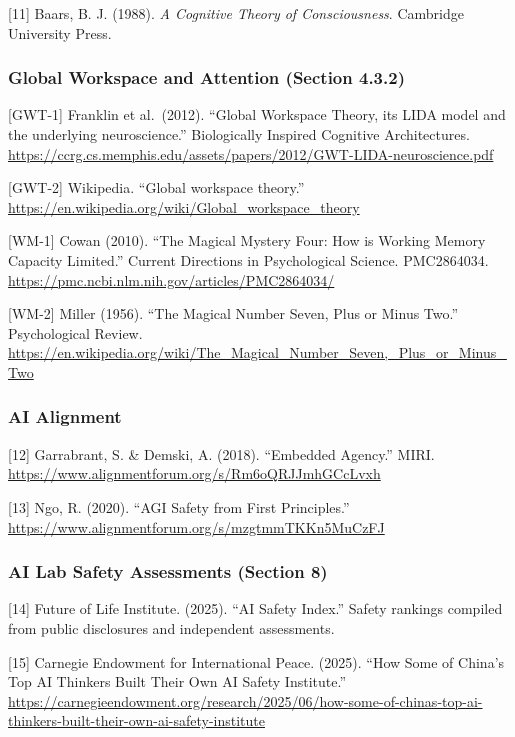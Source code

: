 \documentclass[
  11pt,
]{article}
\begin{document}
{[}11{]} Baars, B. J. (1988). \emph{A Cognitive Theory of
Consciousness}. Cambridge University Press.

\subsubsection{Global Workspace and Attention (Section
4.3.2)}\label{global-workspace-and-attention-section-4.3.2}

{[}GWT-1{]} Franklin et al.~(2012). ``Global Workspace Theory, its LIDA
model and the underlying neuroscience.'' Biologically Inspired Cognitive
Architectures.
\url{https://ccrg.cs.memphis.edu/assets/papers/2012/GWT-LIDA-neuroscience.pdf}

{[}GWT-2{]} Wikipedia. ``Global workspace theory.''
\url{https://en.wikipedia.org/wiki/Global_workspace_theory}

{[}WM-1{]} Cowan (2010). ``The Magical Mystery Four: How is Working
Memory Capacity Limited.'' Current Directions in Psychological Science.
PMC2864034. \url{https://pmc.ncbi.nlm.nih.gov/articles/PMC2864034/}

{[}WM-2{]} Miller (1956). ``The Magical Number Seven, Plus or Minus
Two.'' Psychological Review.
\url{https://en.wikipedia.org/wiki/The_Magical_Number_Seven,_Plus_or_Minus_Two}

\subsubsection{AI Alignment}\label{ai-alignment}

{[}12{]} Garrabrant, S. \& Demski, A. (2018). ``Embedded Agency.'' MIRI.
\url{https://www.alignmentforum.org/s/Rm6oQRJJmhGCcLvxh}

{[}13{]} Ngo, R. (2020). ``AGI Safety from First Principles.''
\url{https://www.alignmentforum.org/s/mzgtmmTKKn5MuCzFJ}

\subsubsection{AI Lab Safety Assessments (Section
8)}\label{ai-lab-safety-assessments-section-8}

{[}14{]} Future of Life Institute. (2025). ``AI Safety Index.'' Safety
rankings compiled from public disclosures and independent assessments.

{[}15{]} Carnegie Endowment for International Peace. (2025). ``How Some
of China's Top AI Thinkers Built Their Own AI Safety Institute.''
\url{https://carnegieendowment.org/research/2025/06/how-some-of-chinas-top-ai-thinkers-built-their-own-ai-safety-institute}
\end{document}
